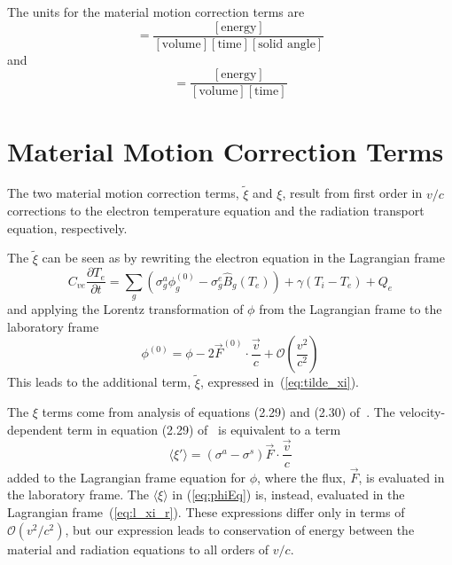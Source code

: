\documentclass[12pt]{article}
\newcommand{\partl}[2]{\ensuremath{\frac{\partial{#1}}{\partial{#2}}}}\newcommand{\del}{\ensuremath{\vec{\nabla}}}
\newcommand{\Bg}{\ensuremath{\hat{B}_{g}}}
\newcommand{\units}[1]{\ensuremath{[\mbox{#1}]}}
\begin{document}
The units for the material motion correction terms are
\begin{equation}
        [\xi] = \frac{\units{energy}}
                     {\units{volume} \units{time} \units{solid angle}}
\end{equation}
and
\begin{equation}
        [\tilde{\xi}] = \frac{\units{energy}}
                             {\units{volume} \units{time}}
\end{equation}

\section{Material Motion Correction Terms}

The two material motion correction terms, $\tilde{\xi}$ and $\xi$, result
from first order in $v/c$ corrections to the electron temperature equation
and the radiation transport equation, respectively.

The $\tilde{\xi}$ can be seen as by rewriting the electron equation in
the Lagrangian frame
\begin{equation}
        C_{ve} \partl{T_{e}}{t} = 
                \sum_{g} \left(
                        \sigma_{g}^{a} \phi^{(0)}_{g}
                        - \sigma_{g}^{e} \Bg(T_{e}) \right)
                        + \gamma (T_{i} - T_{e}) + Q_{e}
\end{equation}
and applying the Lorentz transformation of $\phi$ from the Lagrangian frame
to the laboratory frame~\cite[page 417]{MihalasMihalas}
\begin{equation}
        \phi^{(0)} = \phi - 2 \vec{F}^{(0)} \cdot \frac{\vec{v}}{c} 
                 + \mathcal{O}(\frac{v^2}{c^2})
\end{equation}
This leads to the additional term, $\tilde{\xi}$,
expressed in~(\ref{eq:tilde_xi}).

The $\xi$ terms come from analysis of equations (2.29) and (2.30)
of~\cite{MihalasKlein}.
The velocity-dependent term in equation (2.29) of~\cite{MihalasKlein}
is equivalent to a term
\begin{equation}
        \langle \xi' \rangle = (\sigma^{a} - \sigma^{s}) \vec{F}
                        \cdot \frac{\vec{v}}{c}
\end{equation}
added to the Lagrangian frame equation for $\phi$,
where the flux, $\vec{F}$, is evaluated in the laboratory frame.
The $\langle \xi \rangle$ in (\ref{eq:phiEq}) is, instead, evaluated in the
Lagrangian frame~(\ref{eq:l_xi_r}).
These expressions differ only in terms of $\mathcal{O}(v^2/c^2)$,
but our expression
leads to conservation of energy between the material and radiation equations
to all orders of $v/c$.
\end{document}

